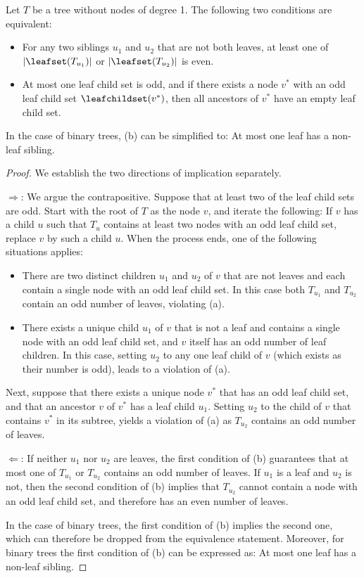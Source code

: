 \begin{proposition}\label{prop:connectivity:equivalence}
Let $T$ be a tree without nodes of degree 1. The following two conditions are equivalent:
\begin{itemize}
\item[(a)] For any two siblings $u_1$ and $u_2$ that are not both leaves, at least one of $\lvert\leafset(T_{u_1})\rvert$ or $\lvert\leafset(T_{u_2})\rvert$ is even.
\item[(b)] At most one leaf child set is odd, and if there exists a node $v^*$ with an odd leaf child set $\leafchildset(v^*)$, then all ancestors of $v^*$ have an empty leaf child set.
\end{itemize}
In the case of binary trees, (b) can be simplified to: At most one leaf has a non-leaf sibling.
\end{proposition}
\begin{proof}
We establish the two directions of implication separately. 

\medskip

\noindent
$\Rightarrow$: We argue the contrapositive. Suppose that at least two of the leaf child sets are odd. Start with the root of $T$ as the node $v$, and iterate the following: If $v$ has a child $u$ such that $T_u$ contains at least two nodes with an odd leaf child set, replace $v$ by such a child $u$. When the process ends, one of the following situations applies:
\begin{itemize}
\item There are two distinct children $u_1$ and $u_2$ of $v$ that are not leaves and each contain a single node with an odd leaf child set. In this case both $T_{u_1}$ and $T_{u_2}$ contain an odd number of leaves, violating (a).
\item There exists a unique child $u_1$ of $v$ that is not a leaf and contains a single node with an odd leaf child set, and $v$ itself has an odd number of leaf children. In this case, setting $u_2$ to any one leaf child of $v$ (which exists as their number is odd), leads to a violation of (a).
\end{itemize} 
Next, suppose that there exists a unique node $v^*$ that has an odd leaf child set, and that an ancestor $v$ of $v^*$ has a leaf child $u_1$. Setting $u_2$ to the child of $v$ that contains $v^*$ in its subtree, yields a violation of (a) as $T_{u_2}$ contains an odd number of leaves.

\medskip

\noindent
$\Leftarrow$: If neither $u_1$ nor $u_2$ are leaves, the first condition of (b) guarantees that at most one of $T_{u_1}$ or $T_{u_2}$ contains an odd number of leaves. If $u_1$ is a leaf and $u_2$ is not, then the second condition of (b) implies that $T_{u_2}$ cannot contain a node with an odd leaf child set, and therefore has an even number of leaves.

\medskip

In the case of binary trees, the first condition of (b) implies the second one, which can therefore be dropped from the equivalence statement. Moreover, for binary trees the first condition of (b) can be expressed as: At most one leaf has a non-leaf sibling.
\end{proof}

